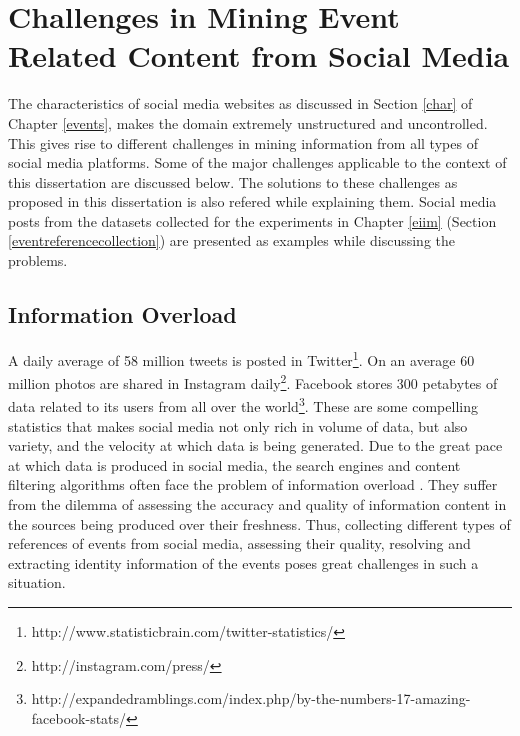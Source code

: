 
\chapter{Challenges in Mining Event Related Content from Social Media} %
\thispagestyle{fancy}
\label{challenges} %

\doublespacing
\setlength{\parindent}{1cm}
The characteristics of social media websites as discussed in Section \ref{char} of Chapter \ref{events}, makes the domain extremely unstructured and uncontrolled. This gives rise to different challenges in mining information from all types of social media platforms. Some of the major challenges applicable to the context of this dissertation are discussed below. The solutions to these challenges as proposed in this dissertation is also refered while explaining them. Social media posts from the datasets collected for the experiments in Chapter \ref{eiim} (Section \ref{eventreferencecollection}) are presented as examples while discussing the problems.

\section{Information Overload\label{informationoverload}}
A daily average of 58 million tweets is posted in Twitter\footnote{http://www.statisticbrain.com/twitter-statistics/}. On an average 60 million  photos are shared in Instagram daily\footnote{http://instagram.com/press/}. Facebook stores 300 petabytes  of data related to its users from all over the world\footnote{http://expandedramblings.com/index.php/by-the-numbers-17-amazing-facebook-stats/}. These are some compelling statistics that makes social media not only rich in volume of data, but also variety, and the velocity at which data is being generated. Due to the great pace at which data is produced in social media, the search engines and content filtering algorithms often face the problem of information overload \cite{hemp2009death}. They suffer from the dilemma of assessing the accuracy and quality of information content in the sources being produced over their freshness. Thus, collecting different types of references of events from social media, assessing their quality, resolving and extracting identity information of the events poses great challenges in such a situation. 

